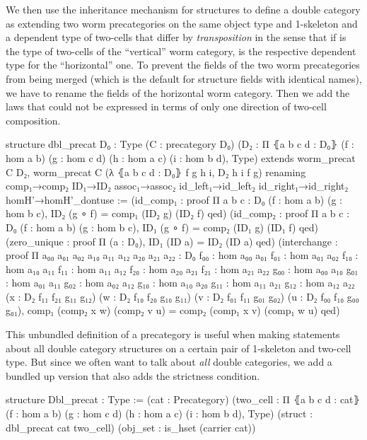 We then use the inheritance mechanism for structures to define a double category
as extending two worm precategories on the same object type  and 1-skeleton
 and a dependent type of two-cells that differ by \emph{transposition}
in the sense that if  is the type of two-cells of the ``vertical''
worm category,  is the respective
dependent type for the ``horizontal'' one.
To prevent the fields of the two worm precategories from being merged (which is
the default for structure fields with identical names), we have to rename
the fields of the horizontal worm category.
Then we add the laws that could not be expressed in terms of only one direction
of two-cell composition.
\begin{leancode}
structure dbl_precat {D₀ : Type} (C : precategory D₀)
  (D₂ : Π ⦃a b c d : D₀⦄ (f : hom a b) (g : hom c d) (h : hom a c) (i : hom b d),
    Type)
  extends worm_precat C D₂,
    worm_precat C (λ ⦃a b c d : D₀⦄ f g h i, D₂ h i f g)
  renaming comp₁→comp₂ ID₁→ID₂ assoc₁→assoc₂
    id_left₁→id_left₂ id_right₁→id_right₂ homH'→homH'_dontuse :=
  (id_comp₁ : proof Π {a b c : D₀} (f : hom a b) (g : hom b c),
    ID₂ (g ∘ f) = comp₁ (ID₂ g) (ID₂ f) qed)
  (id_comp₂ : proof Π {a b c : D₀} (f : hom a b) (g : hom b c),
    ID₁ (g ∘ f) = comp₂ (ID₁ g) (ID₁ f) qed)
  (zero_unique : proof Π (a : D₀), ID₁ (ID a) = ID₂ (ID a) qed)
  (interchange : proof Π {a₀₀ a₀₁ a₀₂ a₁₀ a₁₁ a₁₂ a₂₀ a₂₁ a₂₂ : D₀}
    {f₀₀ : hom a₀₀ a₀₁} {f₀₁ : hom a₀₁ a₀₂} {f₁₀ : hom a₁₀ a₁₁}
    {f₁₁ : hom a₁₁ a₁₂} {f₂₀ : hom a₂₀ a₂₁} {f₂₁ : hom a₂₁ a₂₂}
    {g₀₀ : hom a₀₀ a₁₀} {g₀₁ : hom a₀₁ a₁₁} {g₀₂ : hom a₀₂ a₁₂}
    {g₁₀ : hom a₁₀ a₂₀} {g₁₁ : hom a₁₁ a₂₁} {g₁₂ : hom a₁₂ a₂₂}
    (x : D₂ f₁₁ f₂₁ g₁₁ g₁₂) (w : D₂ f₁₀ f₂₀ g₁₀ g₁₁)
    (v : D₂ f₀₁ f₁₁ g₀₁ g₀₂) (u : D₂ f₀₀ f₁₀ g₀₀ g₀₁),
    comp₁ (comp₂ x w) (comp₂ v u) = comp₂ (comp₁ x v) (comp₁ w u) qed)
\end{leancode}

This unbundled definition of a precategory is useful when making statements about
all double category structures on a certain pair of 1-skeleton and two-cell type.
But since we often want to talk about \emph{all} double categories, we add a bundled
up version that also adds the strictness condition. %
\begin{leancode}
structure Dbl_precat : Type :=
  (cat : Precategory)
  (two_cell : Π ⦃a b c d : cat⦄ (f : hom a b)
    (g : hom c d) (h : hom a c) (i : hom b d), Type)
  (struct : dbl_precat cat two_cell)
  (obj_set : is_hset (carrier cat))
\end{leancode}

